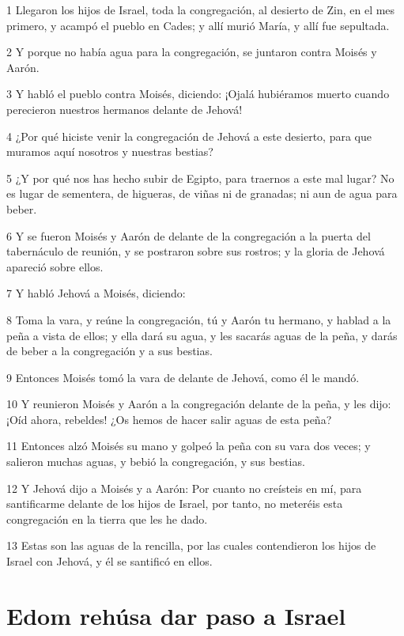 \par 1 Llegaron los hijos de Israel, toda la congregación, al desierto de Zin, en el mes primero, y acampó el pueblo en Cades; y allí murió María, y allí fue sepultada.
\par 2 Y porque no había agua para la congregación, se juntaron contra Moisés y Aarón.
\par 3 Y habló el pueblo contra Moisés, diciendo: ¡Ojalá hubiéramos muerto cuando perecieron nuestros hermanos delante de Jehová!
\par 4 ¿Por qué hiciste venir la congregación de Jehová a este desierto, para que muramos aquí nosotros y nuestras bestias?
\par 5 ¿Y por qué nos has hecho subir de Egipto, para traernos a este mal lugar? No es lugar de sementera, de higueras, de viñas ni de granadas; ni aun de agua para beber.
\par 6 Y se fueron Moisés y Aarón de delante de la congregación a la puerta del tabernáculo de reunión, y se postraron sobre sus rostros; y la gloria de Jehová apareció sobre ellos.
\par 7 Y habló Jehová a Moisés, diciendo:
\par 8 Toma la vara, y reúne la congregación, tú y Aarón tu hermano, y hablad a la peña a vista de ellos; y ella dará su agua, y les sacarás aguas de la peña, y darás de beber a la congregación y a sus bestias.
\par 9 Entonces Moisés tomó la vara de delante de Jehová, como él le mandó.
\par 10 Y reunieron Moisés y Aarón a la congregación delante de la peña, y les dijo: ¡Oíd ahora, rebeldes! ¿Os hemos de hacer salir aguas de esta peña?
\par 11 Entonces alzó Moisés su mano y golpeó la peña con su vara dos veces; y salieron muchas aguas, y bebió la congregación, y sus bestias.
\par 12 Y Jehová dijo a Moisés y a Aarón: Por cuanto no creísteis en mí, para santificarme delante de los hijos de Israel, por tanto, no meteréis esta congregación en la tierra que les he dado.
\par 13 Estas son las aguas de la rencilla, por las cuales contendieron los hijos de Israel con Jehová, y él se santificó en ellos.

\section*{Edom rehúsa dar paso a Israel}

